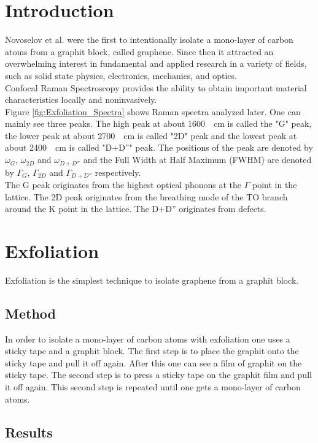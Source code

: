\documentclass[%
 reprint,
amsmath,amssymb,
pra,
]{revtex4-1}
\begin{document}
\section{Introduction}
Novoselov et al. were the first to intentionally isolate a mono-layer of carbon atoms from a graphit block, called graphene.\citep{Novoselov2004} Since then it attracted an overwhelming interest in fundamental and applied research in a variety of fields, such as solid state physics, electronics, mechanics, and optics.\citep{NeumannStampfer} \\
Confocal Raman Spectroscopy provides the ability to obtain important material characteristics locally and noninvasively.\citep{NeumannStampfer} \\
Figure \ref{fig:Exfoliation_Spectra} shows Raman spectra analyzed later. One can mainly see three peaks. The high peak at about \SI{1600}{\per cm} is called the "G" peak, the lower peak at about \SI{2700}{\per cm} is called "2D" peak and the lowest peak at about \SI{2400}{\per cm} is called "D+D''" peak. The positions of the peak are denoted by $\omega _G$, $\omega _{2D}$ and $\omega _{D+D''}$ and the Full Width at Half Maximum (FWHM) are denoted by $\Gamma _G$, $\Gamma _{2D}$ and $\Gamma _{D+D''}$ respectively. \\
The G peak originates from the highest optical phonons at the $\Gamma$ point in the lattice. The 2D peak originates from the breathing mode of the TO branch around the K point in the lattice. The D+D'' originates from defects.\citep{NeumannStampfer}


\section{Exfoliation}
Exfoliation is the simplest technique to isolate graphene from a graphit block.

\subsection{Method}
In order to isolate a mono-layer of carbon atoms with exfoliation one uses a sticky tape and a graphit block. The first step is to place the graphit onto the sticky tape and pull it off again. After this one can see a film of graphit on the sticky tape. The second step is to press a sticky tape on the graphit film and pull it off again. This second step is repeated until one gets a mono-layer of carbon atoms.

\subsection{Results}
\end{document}
